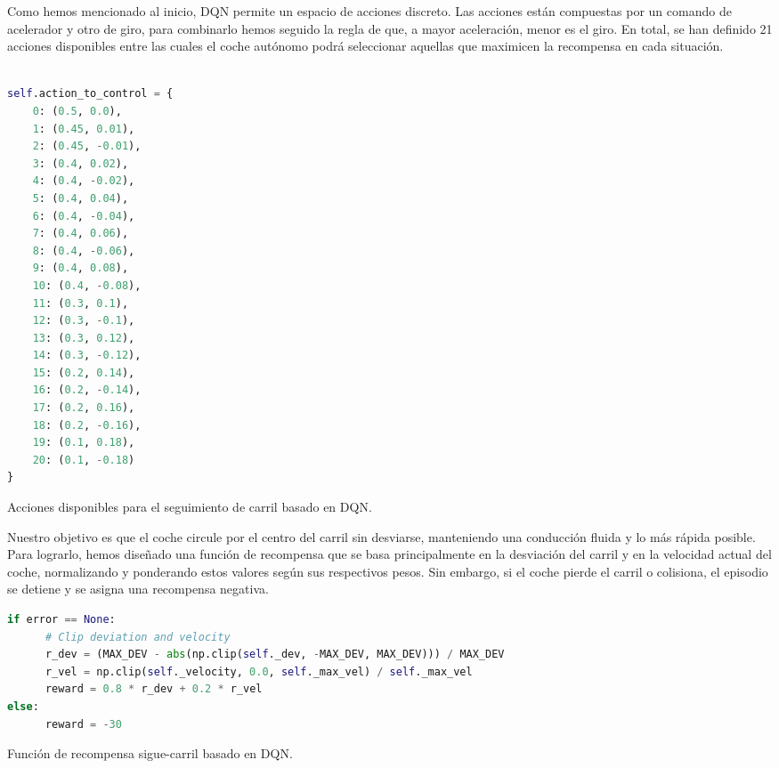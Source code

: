 \newpage

Como hemos mencionado al inicio, \ac{DQN} permite un espacio de acciones discreto. Las acciones están compuestas por un comando de acelerador y otro de giro, para combinarlo hemos seguido la regla de que, a mayor aceleración, menor es el giro. En total, se han definido 21 acciones disponibles entre las cuales el coche autónomo podrá seleccionar aquellas que maximicen la recompensa en cada situación.

\begin{code}[h]
\begin{lstlisting}[language=Python]

self.action_to_control = {
    0: (0.5, 0.0),
    1: (0.45, 0.01), 
    2: (0.45, -0.01),
    3: (0.4, 0.02),
    4: (0.4, -0.02),
    5: (0.4, 0.04),
    6: (0.4, -0.04),
    7: (0.4, 0.06),
    8: (0.4, -0.06),
    9: (0.4, 0.08),
    10: (0.4, -0.08),
    11: (0.3, 0.1),
    12: (0.3, -0.1),
    13: (0.3, 0.12),
    14: (0.3, -0.12),
    15: (0.2, 0.14),
    16: (0.2, -0.14),
    17: (0.2, 0.16),
    18: (0.2, -0.16),
    19: (0.1, 0.18),
    20: (0.1, -0.18)
}
\end{lstlisting}
\caption[Acciones disponibles para el seguimiento de carril basado en \ac{DQN}]{Acciones disponibles para el seguimiento de carril basado en \ac{DQN}.}
\label{cod:acc_dqn}
\end{code}

Nuestro objetivo es que el coche circule por el centro del carril sin desviarse, manteniendo una conducción fluida y lo más rápida posible. Para lograrlo, hemos diseñado una función de recompensa que se basa principalmente en la desviación del carril y en la velocidad actual del coche, normalizando y ponderando estos valores según sus respectivos pesos. Sin embargo, si el coche pierde el carril o colisiona, el episodio se detiene y se asigna una recompensa negativa.

\begin{code}[h]
\begin{lstlisting}[language=Python]
if error == None:
      # Clip deviation and velocity
      r_dev = (MAX_DEV - abs(np.clip(self._dev, -MAX_DEV, MAX_DEV))) / MAX_DEV
      r_vel = np.clip(self._velocity, 0.0, self._max_vel) / self._max_vel
      reward = 0.8 * r_dev + 0.2 * r_vel
else:
      reward = -30
\end{lstlisting}
\caption[Función de recompensa sigue-carril basado en \ac{DQN}]{Función de recompensa sigue-carril basado en \ac{DQN}.}
\label{cod:rew_dqn}
\end{code}

